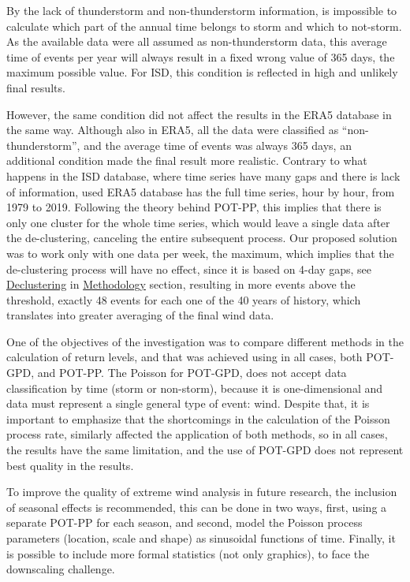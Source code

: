 \documentclass[12pt,oneside]{reedthesis}
\begin{document}
By the lack of thunderstorm and non-thunderstorm information, is impossible to calculate which part of the annual time belongs to storm and which to not-storm. As the available data were all assumed as non-thunderstorm data, this average time of events per year will always result in a fixed wrong value of 365 days, the maximum possible value. For ISD, this condition is reflected in high and unlikely final results.

However, the same condition did not affect the results in the ERA5 database in the same way. Although also in ERA5, all the data were classified as ``non-thunderstorm'', and the average time of events was always 365 days, an additional condition made the final result more realistic. Contrary to what happens in the ISD database, where time series have many gaps and there is lack of information, used ERA5 database has the full time series, hour by hour, from 1979 to 2019. Following the theory behind POT-PP, this implies that there is only one cluster for the whole time series, which would leave a single data after the de-clustering, canceling the entire subsequent process. Our proposed solution was to work only with one data per week, the maximum, which implies that the de-clustering process will have no effect, since it is based on 4-day gaps, see \protect\hyperlink{decluster}{Declustering} in \protect\hyperlink{rmd-method}{Methodology} section, resulting in more events above the threshold, exactly 48 events for each one of the 40 years of history, which translates into greater averaging of the final wind data.

One of the objectives of the investigation was to compare different methods in the calculation of return levels, and that was achieved using in all cases, both POT-GPD, and POT-PP. The Poisson for POT-GPD, does not accept data classification by time (storm or non-storm), because it is one-dimensional and data must represent a single general type of event: wind. Despite that, it is important to emphasize that the shortcomings in the calculation of the Poisson process rate, similarly affected the application of both methods, so in all cases, the results have the same limitation, and the use of POT-GPD does not represent best quality in the results.

To improve the quality of extreme wind analysis in future research, the inclusion of seasonal effects is recommended, this can be done in two ways, first, using a separate POT-PP for each season, and second, model the Poisson process parameters (location, scale and shape) as sinusoidal functions of time. Finally, it is possible to include more formal statistics (not only graphics), to face the downscaling challenge.
\end{document}
